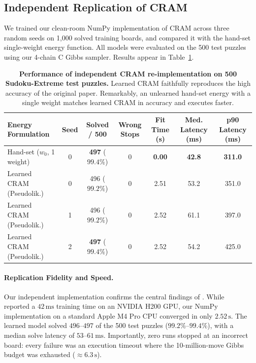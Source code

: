 \documentclass{article} %
\begin{document}
\subsection{Independent Replication of CRAM}

We trained our clean-room NumPy implementation of CRAM across three random seeds on 1,000 solved training boards, and compared it with the hand-set single-weight energy function. All models were evaluated on the 500 test puzzles using our 4-chain C Gibbs sampler. Results appear in Table~\ref{tab:cram_results}.

\begin{table}[t]
\centering
\small
\caption{\textbf{Performance of independent CRAM re-implementation on 500 Sudoku-Extreme test puzzles.} Learned CRAM faithfully reproduces the high accuracy of the original paper. Remarkably, an unlearned hand-set energy with a single weight matches learned CRAM in accuracy and executes faster.}
\label{tab:cram_results}
\begin{tabular}{lcccccc}
\toprule
\textbf{Energy Formulation} & \textbf{Seed} & \textbf{Solved / 500} & \textbf{Wrong Stops} & \textbf{Fit Time (s)} & \textbf{Med. Latency (ms)} & \textbf{p90 Latency (ms)} \\
\midrule
Hand-set ($w_0$, 1 weight) & 0 & \textbf{497} ($99.4\%$) & 0 & \textbf{0.00} & \textbf{42.8} & \textbf{311.0} \\
Learned CRAM (Pseudolik.)    & 0 & 496 ($99.2\%$)          & 0 & 2.51          & 53.2          & 351.0 \\
Learned CRAM (Pseudolik.)    & 1 & 496 ($99.2\%$)          & 0 & 2.52          & 61.1          & 397.0 \\
Learned CRAM (Pseudolik.)    & 2 & \textbf{497} ($99.4\%$) & 0 & 2.52          & 54.2          & 425.0 \\
\bottomrule
\end{tabular}
\end{table}

\paragraph{Replication Fidelity and Speed.}
Our independent implementation confirms the central findings of \citet{hoover2026cram}. While \citet{hoover2026cram} reported a $42\,\mathrm{ms}$ training time on an NVIDIA H200 GPU, our NumPy implementation on a standard Apple M4 Pro CPU converged in only $2.52\,\mathrm{s}$. The learned model solved $496\text{--}497$ of the 500 test puzzles ($99.2\%\text{--}99.4\%$), with a median solve latency of $53\text{--}61\,\mathrm{ms}$. Importantly, zero runs stopped at an incorrect board: every failure was an execution timeout where the 10-million-move Gibbs budget was exhausted ($\approx 6.3\,\mathrm{s}$).
\end{document}
